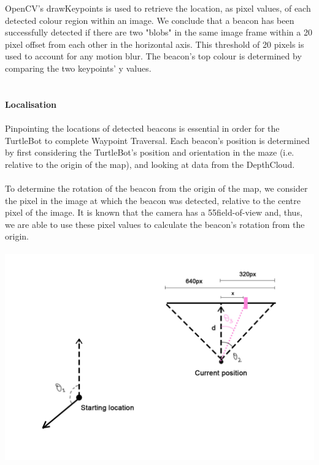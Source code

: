 \documentclass[titlepage,12pt,a4paper]{article}
\begin{document}
\noindent
OpenCV's drawKeypoints is used to retrieve the location, as pixel values, of each detected colour region within an image. We conclude that a beacon has been successfully detected if there are two "blobs" in the same image frame within a 20 pixel offset from each other in the horizontal axis. This threshold of 20 pixels is used to account for any motion blur. The beacon's top colour is determined by comparing the two keypoints' y values.\\
\\
\large{\textbf{\\Localisation}} \\
\normalsize
\\
Pinpointing the locations of detected beacons is essential in order for the TurtleBot to complete Waypoint Traversal. Each beacon's position is determined by first considering the TurtleBot's position and orientation in the maze (i.e. relative to the origin of the map), and looking at data from the DepthCloud. \\
\\
To determine the rotation of the beacon from the origin of the map, we consider the pixel in the image at which the beacon was detected, relative to the centre pixel of the image. It is known that the camera has a 55\degree field-of-view and, thus, we are able to use these pixel values to calculate the beacon's rotation from the origin. \\
\\
\includegraphics[scale=0.3]{beacon.jpg}
\end{document}
